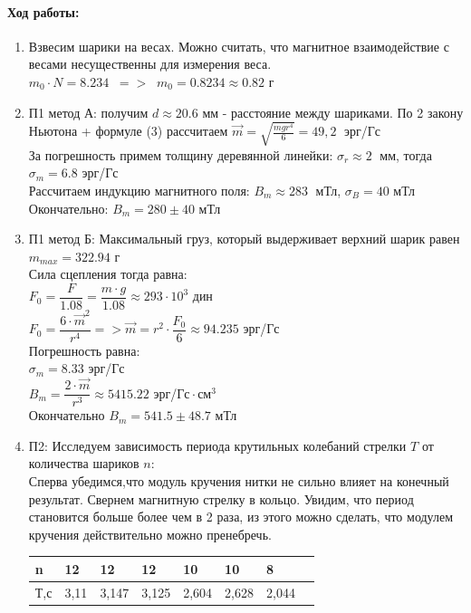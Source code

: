 \documentclass[a4paper,12pt]{article}
\begin{document}
\paragraph{Ход работы:}
\begin{enumerate}
\itemsep0em
\item Взвесим шарики на весах. Можно считать, что магнитное взаимодействие с весами несущественны для измерения веса. $m_0\cdot N = 8.234 \;\; =>\;\; m_0 = 0.8234\approx 0.82$ г
\item П1 метод А: получим $d\approx 20.6$ мм - расстояние между шариками. По 2 закону Ньютона + формуле (3) рассчитаем $\overrightarrow{m} = \sqrt{\frac{mgr^4}{6}} = 49,2\;$ эрг/Гс\\
За погрешность примем толщину деревянной линейки: $\sigma_{r}\approx 2\;$ мм, тогда $\sigma_{m} = 6.8$ эрг/Гс\\
Рассчитаем индукцию магнитного поля: $B_{m} \approx 283 \;$ мТл, $\sigma_{B} = 40$ мТл\\
Окончательно: $B_{m} = 280\pm 40$ мТл
\item П1 метод Б: Максимальный груз, который выдерживает верхний шарик равен $m_{max}=322.94$ г \\
Сила сцепления тогда равна:\\
$F_0=\dfrac{F}{1.08}=\dfrac{m\cdot g}{1.08}\approx 293 \cdot 10^3$ дин \\
$F_0 = \dfrac{6\cdot \overrightarrow{m}^2}{r^4} => \overrightarrow{m}=r^2\cdot\dfrac{F_0}{6}\approx 94.235$ эрг/Гс\\
Погрешность равна:\\
$\sigma_{m}=8.33$ эрг/Гс\\
$B_{m}=\dfrac{2\cdot \overrightarrow{m}}{r^3}\approx 5415.22$ эрг/$\text{Гс}\cdot \text{см}^3$\\
Окончательно $B_m = 541.5 \pm 48.7$ мТл
\item П2: Исследуем зависимость периода крутильных колебаний стрелки $T$ от количества шариков $n$:\\
Сперва убедимся,что модуль кручения нитки не сильно влияет на конечный результат. Свернем магнитную стрелку в кольцо. Увидим, что период становится больше более чем в 2 раза, из этого можно сделать, что модулем кручения действительно можно пренебречь.
\begin{table}[h!]
\centering
\begin{tabular}{|l|l|l|l|l|l|l|l|}
\hline
n   & 12    & 12    & 12    & 10    & 10    & 8     &       \\ \hline
Т,с & 3,11  & 3,147 & 3,125 & 2,604 & 2,628 & 2,044 &       \\ \hline

\end{tabular}
\end{table}
\end{enumerate}
\end{document}
